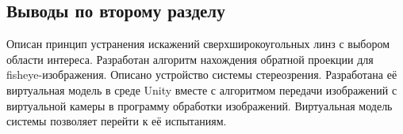 \subsection{Выводы по второму разделу}

Описан принцип устранения искажений сверхширокоугольных линз с выбором области интереса. Разработан алгоритм нахождения обратной 
проекции для fisheye-изображения. Описано устройство системы стереозрения. Разработана её виртуальная модель в среде Unity вместе с 
алгоритмом передачи изображений с виртуальной камеры в программу обработки изображений.  
Виртуальная модель системы позволяет перейти к её испытаниям.